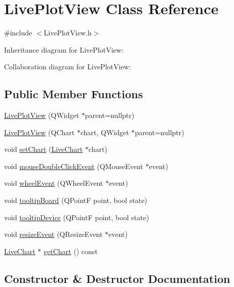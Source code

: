 \hypertarget{class_live_plot_view}{}\section{Live\+Plot\+View Class Reference}
\label{class_live_plot_view}


{\ttfamily \#include $<$Live\+Plot\+View.\+h$>$}



Inheritance diagram for Live\+Plot\+View\+:


Collaboration diagram for Live\+Plot\+View\+:
\subsection*{Public Member Functions}
\begin{DoxyCompactItemize}
\item 
\hyperlink{class_live_plot_view_a5e494a15b816a69df20c8a1e07b6ed7f}{Live\+Plot\+View} (Q\+Widget $\ast$parent=nullptr)
\item 
\hyperlink{class_live_plot_view_aaae3ec2e94bba7f3a9facca6d50c0a0d}{Live\+Plot\+View} (Q\+Chart $\ast$chart, Q\+Widget $\ast$parent=nullptr)
\item 
void \hyperlink{class_live_plot_view_ae84ce3f1aca9c3927bb32fa16587c057}{set\+Chart} (\hyperlink{class_live_chart}{Live\+Chart} $\ast$chart)
\item 
void \hyperlink{class_live_plot_view_abc389b596474a02dfff0724264cf60ca}{mouse\+Double\+Click\+Event} (Q\+Mouse\+Event $\ast$event)
\item 
void \hyperlink{class_live_plot_view_adaa13a156e69554c5c132389f20973fd}{wheel\+Event} (Q\+Wheel\+Event $\ast$event)
\item 
void \hyperlink{class_live_plot_view_ad9776ae5df100c62c204f19a6f3c8c9f}{tooltip\+Board} (Q\+PointF point, bool state)
\item 
void \hyperlink{class_live_plot_view_a489db6b9f626d4433a7d486487793165}{tooltip\+Device} (Q\+PointF point, bool state)
\item 
void \hyperlink{class_live_plot_view_ace6011bde96cfce1c4513823eb7e53b6}{resize\+Event} (Q\+Resize\+Event $\ast$event)
\item 
\hyperlink{class_live_chart}{Live\+Chart} $\ast$ \hyperlink{class_live_plot_view_a5acf8cf6f6b1012182b83c6a65dde8ed}{get\+Chart} () const
\end{DoxyCompactItemize}


\subsection{Constructor \& Destructor Documentation}
\mbox{\label{class_live_plot_view_a5e494a15b816a69df20c8a1e07b6ed7f}} 
